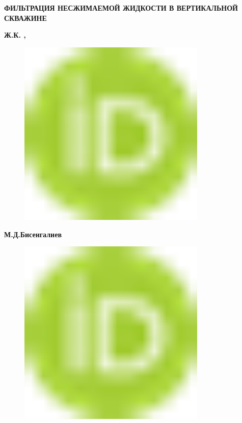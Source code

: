 
{\bfseries ФИЛЬТРАЦИЯ НЕСЖИМАЕМОЙ ЖИДКОСТИ В ВЕРТИКАЛЬНОЙ СКВАЖИНЕ}

{\bfseries Ж.К. ,}

\begin{figure}[H]
	\centering
	\includegraphics[width=0.8\textwidth]{media/gorn/image1}
	\caption*{}
\end{figure}
{\bfseries М.Д.Бисенгалиев}
\begin{figure}[H]
	\centering
	\includegraphics[width=0.8\textwidth]{media/gorn/image1}
	\caption*{}
\end{figure}
